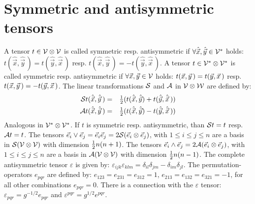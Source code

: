 \documentclass[a4paper,fancyheadings,twoside]{report}
\begin{document}
\section{Symmetric and antisymmetric tensors}
A tensor $t\in{\cal V\otimes V}$ is called symmetric resp. antisymmetric if
$\forall\hat{\vec{x}},\hat{\vec{y}}\in{\cal V^*}$ holds:
$t(\hat{\vec{x}},\hat{\vec{y}}\,)=t(\hat{\vec{y}},\hat{\vec{x}}\,)$ resp.
$t(\hat{\vec{x}},\hat{\vec{y}}\,)=-t(\hat{\vec{y}},\hat{\vec{x}}\,)$.
\npar
A tensor $t\in{\cal V^*\otimes V^*}$ is called symmetric resp. antisymmetric
if $\forall\vec{x},\vec{y}\in{\cal V}$ holds:
$t(\vec{x},\vec{y}\,)=t(\vec{y},\vec{x}\,)$ resp.
$t(\vec{x},\vec{y}\,)=-t(\vec{y},\vec{x}\,)$. The linear transformations
$\cal S$ and $\cal A$ in $\cal V\otimes W$ are defined by:
\begin{eqnarray*}
{\cal S}t(\hat{\vec{x}},\hat{\vec{y}}\,)&=&\mbox{$\frac{1}{2}$}(t(\hat{\vec{x}},\hat{\vec{y}})+t(\hat{\vec{y}},\hat{\vec{x}}\,))\\
{\cal A}t(\hat{\vec{x}},\hat{\vec{y}}\,)&=&\mbox{$\frac{1}{2}$}(t(\hat{\vec{x}},\hat{\vec{y}})-t(\hat{\vec{y}},\hat{\vec{x}}\,))
\end{eqnarray*}
Analogous in $\cal V^*\otimes V^*$. If $t$ is symmetric resp. antisymmetric,
than ${\cal S}t=t$ resp. ${\cal A}t=t$.
\npar
The tensors $\vec{e}_i\vee\vec{e}_j=\vec{e}_i\vec{e}_j=2{\cal S}(\vec{e}_i\otimes\vec{e}_j)$,
with $1\leq i\leq j\leq n$ are a basis in $\cal S(V\otimes V)$ with dimension
$\mbox{$\frac{1}{2}$} n(n+1)$.
\npar
The tensors $\vec{e}_i\wedge\vec{e}_j=2{\cal A}(\vec{e}_i\otimes\vec{e}_j)$,
with $1\leq i\leq j\leq n$ are a basis in $\cal A(V\otimes V)$ with dimension
$\mbox{$\frac{1}{2}$} n(n-1)$.
\npar
The complete antisymmetric tensor $\varepsilon$ is given by:
$\varepsilon_{ijk}\varepsilon_{klm}=\delta_{il}\delta_{jm}-\delta_{im}\delta_{jl}$.
\npar
The permutation-operators $e_{pqr}$ are defined by:
$e_{123}=e_{231}=e_{312}=1$, $e_{213}=e_{132}=e_{321}=-1$, for all other
combinations $e_{pqr}=0$. There is a connection with the $\varepsilon$ tensor:
$\varepsilon_{pqr}=g^{-1/2}e_{pqr}$ and $\varepsilon^{pqr}=g^{1/2}e^{pqr}$.
\end{document}

